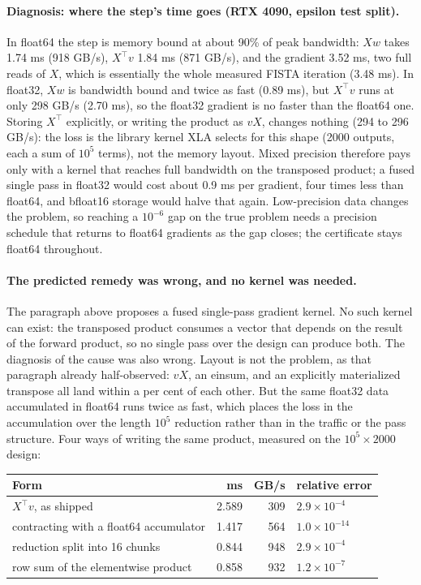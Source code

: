 \paragraph{Diagnosis: where the step's time goes (RTX 4090, epsilon test split).}
 In float64 the
step is memory bound at about 90\% of peak bandwidth: $Xw$ takes 1.74 ms (918
GB/s), $X^\top v$ 1.84 ms (871 GB/s), and the gradient 3.52 ms, two full reads
of $X$, which is essentially the whole measured FISTA iteration (3.48 ms). In
float32, $Xw$ is bandwidth bound and twice as fast (0.89 ms), but $X^\top v$
runs at only 298 GB/s (2.70 ms), so the float32 gradient is no faster than
the float64 one. Storing $X^\top$ explicitly, or writing the product as $vX$,
changes nothing (294 to 296 GB/s): the loss is the library kernel XLA selects
for this shape (2000 outputs, each a sum of $10^5$ terms), not the memory
layout. Mixed precision therefore pays only with a kernel that reaches full
bandwidth on the transposed product; a fused single pass in float32 would
cost about 0.9 ms per gradient, four times less than float64, and bfloat16
storage would halve that again. Low-precision data changes the problem, so
reaching a $10^{-6}$ gap on the true problem needs a precision schedule that
returns to float64 gradients as the gap closes; the certificate stays float64
throughout.

\paragraph{The predicted remedy was wrong, and no kernel was needed.}
The paragraph above proposes a fused single-pass gradient kernel. No such kernel
can exist: the transposed product consumes a vector that depends on the result
of the forward product, so no single pass over the design can produce both. The
diagnosis of the cause was also wrong. Layout is not the problem, as that
paragraph already half-observed: $vX$, an einsum, and an explicitly materialized
transpose all land within a per cent of each other. But the same float32 data
accumulated in float64 runs twice as fast, which places the loss in the
accumulation over the length $10^5$ reduction rather than in the traffic or the
pass structure. Four ways of writing the same product, measured on the $10^5
\times 2000$ design:

\begin{center}
\small
\begin{tabular}{lrrl}
\toprule
Form & ms & GB/s & relative error \\
\midrule
$X^\top v$, as shipped & 2.589 & 309 & $2.9\times10^{-4}$ \\
contracting with a float64 accumulator & 1.417 & 564 & $1.0\times10^{-14}$ \\
reduction split into 16 chunks & 0.844 & 948 & $2.9\times10^{-4}$ \\
row sum of the elementwise product & 0.858 & 932 & $1.2\times10^{-7}$ \\
\bottomrule
\end{tabular}
\end{center}

